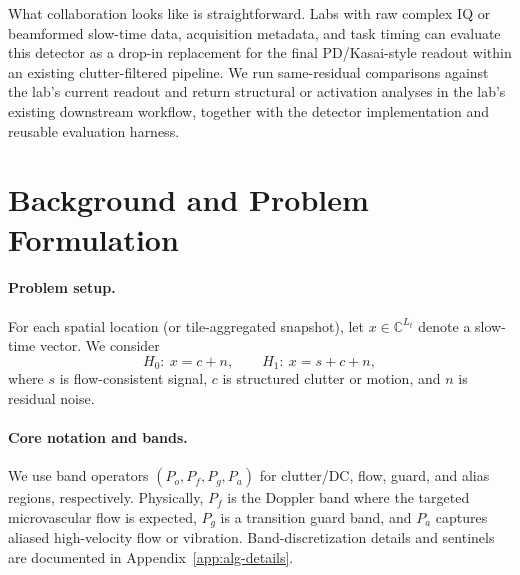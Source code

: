 \documentclass[11pt]{article}
\newcommand{\Pf}{P_f}
\newcommand{\Pa}{P_a}
\newcommand{\Po}{P_o}
\newcommand{\Pg}{P_g}
\newif\ifPAPERONLY
\newcommand{\SuppOrApp}[1]{\ifPAPERONLY Supplementary Material\else Appendix~\ref{#1}\fi}
\begin{document}
What collaboration looks like is straightforward. Labs with raw complex IQ or beamformed slow-time data, acquisition metadata, and task timing can evaluate this detector as a drop-in replacement for the final PD/Kasai-style readout within an existing clutter-filtered pipeline. We run same-residual comparisons against the lab's current readout and return structural or activation analyses in the lab's existing downstream workflow, together with the detector implementation and reusable evaluation harness.

\section{Background and Problem Formulation}
\label{sec:background-problem}

\paragraph{Problem setup.}
For each spatial location (or tile-aggregated snapshot), let $x\in\mathbb{C}^{L_t}$ denote a slow-time vector. We consider
\[
H_0:\ x=c+n,\qquad H_1:\ x=s+c+n,
\]
where $s$ is flow-consistent signal, $c$ is structured clutter or motion, and $n$ is residual noise.

\paragraph{Core notation and bands.}
We use band operators $(\Po,\Pf,\Pg,\Pa)$ for clutter/DC, flow, guard, and alias regions, respectively. Physically, $\Pf$ is the Doppler band where the targeted microvascular flow is expected, $\Pg$ is a transition guard band, and $\Pa$ captures aliased high-velocity flow or vibration. Band-discretization details and sentinels are documented in \SuppOrApp{app:alg-details}.
\end{document}
